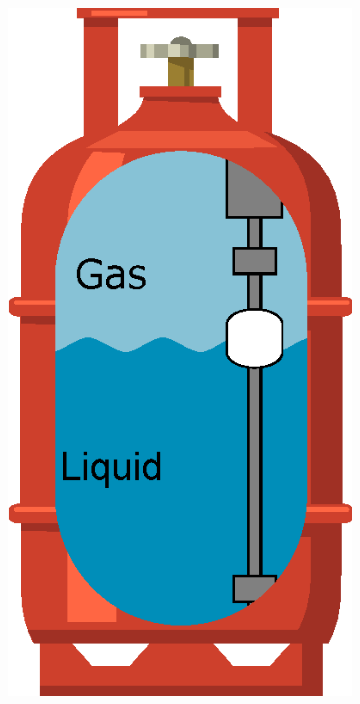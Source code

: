 \begin{figure}[!htp]
    \centering
    \begin{subfigure}{0.15\textwidth}
        \centering
        \includegraphics[width=\linewidth]{Chapters/2CHP/Diagrams/bottleBasefluctuator.eps}

\end{subfigure}
\end{figure}
